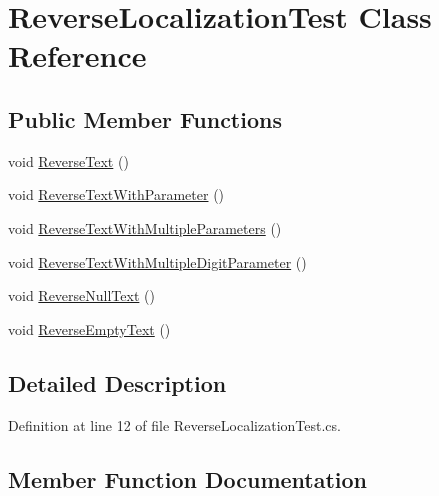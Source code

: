 \hypertarget{class_reverse_localization_test}{}\section{Reverse\+Localization\+Test Class Reference}
\label{class_reverse_localization_test}
\subsection*{Public Member Functions}
\begin{DoxyCompactItemize}
\item 
void \hyperlink{class_reverse_localization_test_aa1ff1ca94246373ac8be7bae8a5c00d0}{Reverse\+Text} ()
\item 
void \hyperlink{class_reverse_localization_test_aac6fe82577e855a91e50b7de3a26189f}{Reverse\+Text\+With\+Parameter} ()
\item 
void \hyperlink{class_reverse_localization_test_ab28d3d1e3b3e844f2eb31550d39ca5ff}{Reverse\+Text\+With\+Multiple\+Parameters} ()
\item 
void \hyperlink{class_reverse_localization_test_a66fac92d8d2fff903e418618c4d405cf}{Reverse\+Text\+With\+Multiple\+Digit\+Parameter} ()
\item 
void \hyperlink{class_reverse_localization_test_acdd1b4037c2b93f9a1d33c68c67fe77a}{Reverse\+Null\+Text} ()
\item 
void \hyperlink{class_reverse_localization_test_ae9fe7c22d0638a3a9b424bfafaec1b54}{Reverse\+Empty\+Text} ()
\end{DoxyCompactItemize}


\subsection{Detailed Description}


Definition at line 12 of file Reverse\+Localization\+Test.\+cs.



\subsection{Member Function Documentation}
\mbox{\label{class_reverse_localization_test_ae9fe7c22d0638a3a9b424bfafaec1b54}} 
